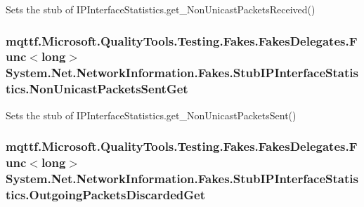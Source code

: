 Sets the stub of I\-P\-Interface\-Statistics.\-get\-\_\-\-Non\-Unicast\-Packets\-Received()

\hypertarget{class_system_1_1_net_1_1_network_information_1_1_fakes_1_1_stub_i_p_interface_statistics_a8ba5cd9f3a5eb35a65e0bfbaa9283701}{
\subsubsection[{Non\-Unicast\-Packets\-Sent\-Get}]{\setlength{\rightskip}{0pt plus 5cm}mqttf.\-Microsoft.\-Quality\-Tools.\-Testing.\-Fakes.\-Fakes\-Delegates.\-Func$<$long$>$ System.\-Net.\-Network\-Information.\-Fakes.\-Stub\-I\-P\-Interface\-Statistics.\-Non\-Unicast\-Packets\-Sent\-Get}}\label{class_system_1_1_net_1_1_network_information_1_1_fakes_1_1_stub_i_p_interface_statistics_a8ba5cd9f3a5eb35a65e0bfbaa9283701}


Sets the stub of I\-P\-Interface\-Statistics.\-get\-\_\-\-Non\-Unicast\-Packets\-Sent()

\hypertarget{class_system_1_1_net_1_1_network_information_1_1_fakes_1_1_stub_i_p_interface_statistics_ae6f8f624e3c6811a03f42f73722ab731}{
\subsubsection[{Outgoing\-Packets\-Discarded\-Get}]{\setlength{\rightskip}{0pt plus 5cm}mqttf.\-Microsoft.\-Quality\-Tools.\-Testing.\-Fakes.\-Fakes\-Delegates.\-Func$<$long$>$ System.\-Net.\-Network\-Information.\-Fakes.\-Stub\-I\-P\-Interface\-Statistics.\-Outgoing\-Packets\-Discarded\-Get}}\label{class_system_1_1_net_1_1_network_information_1_1_fakes_1_1_stub_i_p_interface_statistics_ae6f8f624e3c6811a03f42f73722ab731}


